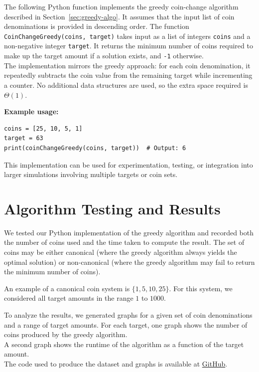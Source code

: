 \documentclass[12pt,a4paper]{report}
\begin{document}
The following Python function implements the greedy coin-change algorithm described in Section~\ref{sec:greedy-algo}. 
It assumes that the input list of coin denominations is provided in descending order. 
The function \texttt{CoinChangeGreedy(coins, target)} takes input as a list of integers \texttt{coins} and a non-negative integer \texttt{target}. 
It returns the minimum number of coins required to make up the target amount if a solution exists, and \texttt{-1} otherwise. \\



The implementation mirrors the greedy approach: for each coin denomination, it repeatedly subtracts the coin value from the remaining target while incrementing a counter. 
No additional data structures are used, so the extra space required is \(\Theta(1)\). 

\textbf{Example usage:}
\begin{verbatim}
coins = [25, 10, 5, 1]
target = 63
print(coinChangeGreedy(coins, target))  # Output: 6
\end{verbatim}

This implementation can be used for experimentation, testing, or integration into larger simulations involving multiple targets or coin sets.

\section{Algorithm Testing and Results}
We tested our Python implementation of the greedy algorithm and recorded both 
the number of coins used and the time taken to compute the result. The set of 
coins may be either canonical (where the greedy algorithm always yields the 
optimal solution) or non-canonical (where the greedy algorithm may fail to 
return the minimum number of coins).

An example of a canonical coin system is 
\(\{1, 5, 10, 25\}\). For this system, we considered all target amounts in the 
range \(1\) to \(1000\).

To analyze the results, we generated graphs for a given set of coin denominations and a range of target amounts. 
For each target, one graph shows the number of coins produced by the greedy algorithm.\\
A second graph shows the runtime of the algorithm as a function of the target amount.\\
The code used to produce the dataset and graphs is available at \href{}{GitHub}. \\%
\end{document}
